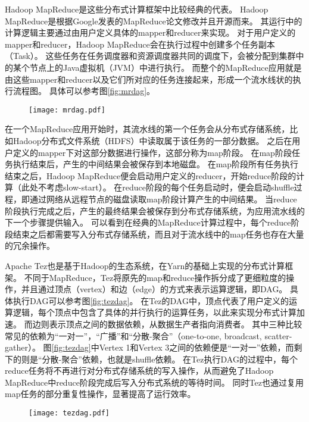 Hadoop MapReduce\cite{hadoop}是这些分布式计算框架中比较经典的代表。
Hadoop MapReduce是根据Google发表的MapReduce\cite{mapreduce}论文修改并且开源而来。
其运行中的计算逻辑主要通过由用户定义具体的mapper和reducer来实现。
对于用户定义的mapper和reducer，Hadoop MapReduce会在执行过程中创建多个任务副本（Task）。
这些任务在任务调度器和资源调度器共同的调度下，会被分配到集群中的某个节点上的Java虚拟机（JVM）中进行执行。
而整个的MapReduce应用就是由这些mapper和reducer以及它们所对应的任务连接起来，形成一个流水线状的执行流程图。
具体可以参考图\ref{fig:mrdag}。

\begin{figure}[!htp]
    \centering
    \texttt{[image: mrdag.pdf]}
\end{figure}

在一个MapReduce应用开始时，其流水线的第一个任务会从分布式存储系统，比如Hadoop分布式文件系统（HDFS）中读取属于该任务的一部分数据。
之后在用户定义的mapper下对这部分数据进行操作，这部分称为map阶段。
在map阶段任务执行结束后，产生的中间结果会被保存到本地磁盘。
在map阶段所有任务执行结束之后，Hadoop MapReduce便会启动用户定义的reducer，开始reduce阶段的计算（此处不考虑slow-start）。
在reduce阶段的每个任务启动时，便会启动shuffle过程，即通过网络从远程节点的磁盘读取map阶段计算产生的中间结果。
当reduce阶段执行完成之后，产生的最终结果会被保存到分布式存储系统，为应用流水线的下一个步骤提供输入。
可以看到在经典的MapReduce计算过程中，每个reduce阶段结束之后都需要写入分布式存储系统，而且对于流水线中的map任务也存在大量的冗余操作。

Apache Tez\cite{tez}也是基于Hadoop的生态系统，在Yarn\cite{yarn}的基础上实现的分布式计算框架。
不同于MapReduce，Tez将原先的map和reduce操作拆分成了更细粒度的操作，并且通过顶点（vertex）和边（edge）的方式来表示运算逻辑，即DAG。
具体执行DAG可以参考图\ref{fig:tezdag}。
在Tez的DAG中，顶点代表了用户定义的运算逻辑，每个顶点中包含了具体的并行执行的运算任务，以此来实现分布式计算加速。
而边则表示顶点之间的数据依赖，从数据生产者指向消费者。
其中三种比较常见的依赖为“一对一”，“广播”和“分散-聚合”（one-to-one, broadcast, scatter-gather）。
图\ref{fig:tezdag}中Vertex 1和Vertex 3之间的依赖便是“一对一”依赖，而剩下的则是“分散-聚合”依赖，也就是shuffle依赖。
在Tez执行DAG的过程中，每个reduce任务将不再进行对分布式存储系统的写入操作，从而避免了Hadoop MapReduce中reduce阶段完成后写入分布式系统的等待时间。
同时Tez也通过复用map任务的部分重复性操作，显著提高了运行效率。

\begin{figure}[!htp]
    \centering
    \texttt{[image: tezdag.pdf]}
\end{figure}

